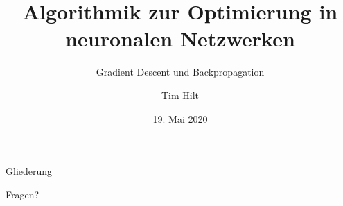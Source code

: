 \documentclass[aspectratio=169, 10pt]{beamer}
\title{Algorithmik zur Optimierung in neuronalen Netzwerken}
\subtitle{Gradient Descent und Backpropagation}
\institute{Hochschule Esslingen --- University of Applied Sciences}
\author{Tim Hilt}
\date{19. Mai 2020}
\begin{document}
\begin{frame}
  \maketitle
\end{frame}

\begin{frame}{Gliederung}
  \tableofcontents
\end{frame}






\begin{frame}[standout]
  Fragen?
\end{frame}

\printbibliography[title=Literaturverzeichnis]
\end{document}
